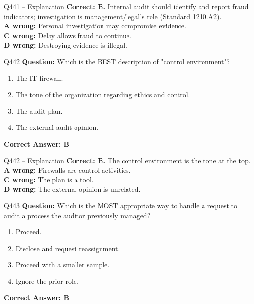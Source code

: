 \documentclass[aspectratio=169,10pt]{beamer}
\begin{document}
	\begin{frame}[t]{Q441 -- Explanation}
		\small
		\textbf{Correct: B.} Internal audit should identify and report fraud indicators; investigation is management/legal's role (Standard 1210.A2). \\[4pt]
		\textbf{A wrong:} Personal investigation may compromise evidence. \\[2pt]
		\textbf{C wrong:} Delay allows fraud to continue. \\[2pt]
		\textbf{D wrong:} Destroying evidence is illegal.
	\end{frame}
	
	\begin{frame}[t]{Q442}
		\small
		\textbf{Question:} Which is the BEST description of "control environment"?
		\begin{enumerate}[label=\Alph*.,itemsep=1pt,topsep=2pt]
			\item The IT firewall.
			\item The tone of the organization regarding ethics and control.
			\item The audit plan.
			\item The external audit opinion.
		\end{enumerate}
		\vspace{4pt}
		\textbf{Correct Answer: B}
	\end{frame}
	
	\begin{frame}[t]{Q442 -- Explanation}
		\small
		\textbf{Correct: B.} The control environment is the tone at the top. \\[4pt]
		\textbf{A wrong:} Firewalls are control activities. \\[2pt]
		\textbf{C wrong:} The plan is a tool. \\[2pt]
		\textbf{D wrong:} The external opinion is unrelated.
	\end{frame}
	
	\begin{frame}[t]{Q443}
		\small
		\textbf{Question:} Which is the MOST appropriate way to handle a request to audit a process the auditor previously managed?
		\begin{enumerate}[label=\Alph*.,itemsep=1pt,topsep=2pt]
			\item Proceed.
			\item Disclose and request reassignment.
			\item Proceed with a smaller sample.
			\item Ignore the prior role.
		\end{enumerate}
		\vspace{4pt}
		\textbf{Correct Answer: B}
	\end{frame}
	
\end{document}

